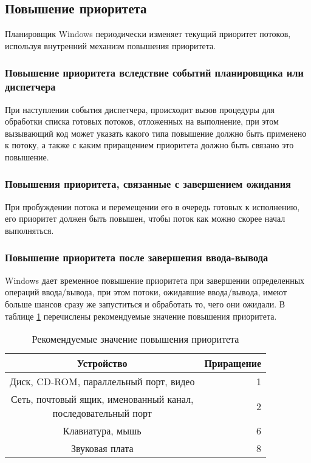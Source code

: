 
\subsection*{Повышение приоритета}

Планировщик Windows периодически изменяет текущий приоритет потоков, используя внутренний механизм повышения приоритета.

\subsubsection*{Повышение приоритета вследствие событий планировщика или диспетчера}

При наступлении события диспетчера, происходит вызов процедуры для обработки списка готовых потоков, отложенных на выполнение, при этом вызывающий код может указать какого типа повышение должно быть применено к потоку, а также с каким приращением приоритета должно быть связано это повышение.

\subsubsection*{Повышения приоритета, связанные с завершением ожидания}

При пробуждении потока и перемещении его в очередь готовых к исполнению, его приоритет должен быть повышен, чтобы поток как можно скорее начал выполняться.

\subsubsection*{Повышение приоритета после завершения ввода-вывода}

Windows дает временное повышение приоритета при завершении определенных операций ввода/вывода, при этом потоки, ожидавшие ввода/вывода, имеют больше шансов сразу же запуститься и обработать то, чего они ожидали.
В таблице \ref{tbl:io} перечислены рекомендуемые значение повышения приоритета.

\begin{table}[ht]
	\begin{center}
		\begin{threeparttable}
			\caption{Рекомендуемые значение повышения приоритета}
			\label{tbl:io}
		\begin{tabular}{|c|r|}
			\hline
			\textbf{Устройство} & \textbf{Приращение} \\
			\hline
			Диск, CD-ROM, параллельный порт, видео & 1 \\
			\hline
			\makecell{Сеть, почтовый ящик, именованный канал, \\  последовательный порт} & 2 \\
			\hline
			Клавиатура, мышь & 6 \\
			\hline
			Звуковая плата & 8 \\
			\hline
		\end{tabular}
	\end{threeparttable}
	\end{center}
\end{table}


